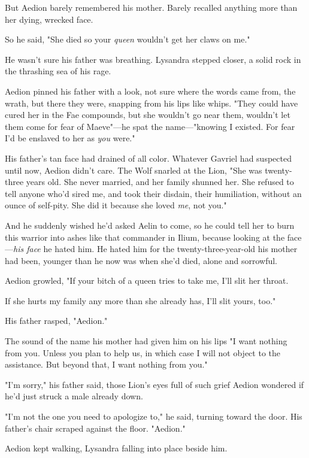 But Aedion barely remembered his mother. Barely recalled anything more than her dying, wrecked face.

So he said, "She died so your \emph{queen} wouldn't get her claws on me."

He wasn't sure his father was breathing. Lysandra stepped closer, a solid rock in the thrashing sea of his rage.

Aedion pinned his father with a look, not sure where the words came from, the wrath, but there they were, snapping from his lips like whips. "They could have cured her in the Fae compounds, but she wouldn't go near them, wouldn't let them come for fear of Maeve"---he spat the name---"knowing I existed. For fear I'd be enslaved to her as
\emph{you} were."

His father's tan face had drained of all color. Whatever Gavriel had suspected until now, Aedion didn't care. The Wolf snarled at the Lion, "She was twenty-three years old. She never married, and her family shunned her. She refused to tell anyone who'd sired me, and took their disdain, their humiliation, without an ounce of self-pity. She did it because she loved \emph{me}, not you."

And he suddenly wished he'd asked Aelin to come, so he could tell her to burn this warrior into ashes like that commander in Ilium, because looking at the face---\emph{his face}  he hated him. He hated him for the twenty-three-year-old his mother had been, younger than he now was when she'd died, alone and sorrowful.

Aedion growled, "If your bitch of a queen tries to take me, I'll slit her throat.

If she hurts my family any more than she already has, I'll slit yours, too."

His father rasped, "Aedion."

The sound of the name his mother had given him on his lips  "I want nothing from you. Unless you plan to help us, in which case I will not object to the  assistance. But beyond that, I want nothing from you."

"I'm sorry," his father said, those Lion's eyes full of such grief Aedion wondered if he'd just struck a male already down.

"I'm not the one you need to apologize to," he said, turning toward the door. His father's chair scraped against the floor. "Aedion."

Aedion kept walking, Lysandra falling into place beside him.


